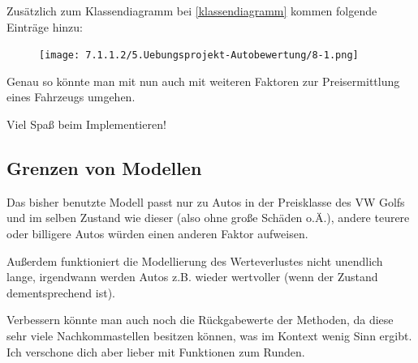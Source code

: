\documentclass{scrartcl}   %
\begin{document}
Zusätzlich zum Klassendiagramm bei \ref{klassendiagramm} kommen folgende Einträge hinzu:

\begin{figure}[ht]
	\centering
	\texttt{[image: 7.1.1.2/5.Uebungsprojekt-Autobewertung/8-1.png]}
\end{figure}

Genau so könnte man mit nun auch mit weiteren Faktoren zur Preisermittlung eines Fahrzeugs umgehen.

Viel Spaß beim Implementieren!

\subsection{Grenzen von Modellen}

Das bisher benutzte Modell passt nur zu Autos in der Preisklasse des VW Golfs und im selben Zustand wie dieser (also ohne große Schäden o.Ä.), andere teurere oder billigere Autos würden einen anderen Faktor aufweisen.

Außerdem funktioniert die Modellierung des Werteverlustes nicht unendlich lange, irgendwann werden Autos z.B. wieder wertvoller (wenn der Zustand dementsprechend ist).

Verbessern könnte man auch noch die Rückgabewerte der Methoden, da diese sehr viele Nachkommastellen besitzen können, was im Kontext wenig Sinn ergibt. Ich verschone dich aber lieber mit Funktionen zum Runden.
\end{document}
